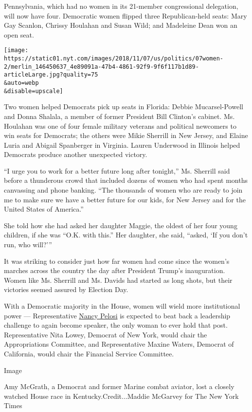 Pennsylvania, which had no women in its 21-member congressional
delegation, will now have four. Democratic women flipped three
Republican-held seats: Mary Gay Scanlon, Chrissy Houlahan and Susan
Wild; and Madeleine Dean won an open seat.

\texttt{[image: https://static01.nyt.com/images/2018/11/07/us/politics/07women-2/merlin\_146450637\_4e89091a-47b4-4861-92f9-9f6f117b1d89-articleLarge.jpg?quality=75\\\&auto=webp\\\&disable=upscale]}

Two women helped Democrats pick up seats in Florida: Debbie
Mucarsel-Powell and Donna Shalala, a member of former President Bill
Clinton's cabinet. Ms. Houlahan was one of four female military veterans
and political newcomers to win seats for Democrats; the others were
Mikie Sherrill in New Jersey, and Elaine Luria and Abigail Spanberger in
Virginia. Lauren Underwood in Illinois helped Democrats produce another
unexpected victory.

``I urge you to work for a better future long after tonight,'' Ms.
Sherrill said before a thunderous crowd that included dozens of women
who had spent months canvassing and phone banking. ``The thousands of
women who are ready to join me to make sure we have a better future for
our kids, for New Jersey and for the United States of America.''

She told how she had asked her daughter Maggie, the oldest of her four
young children, if she was ``O.K. with this.'' Her daughter, she said,
``asked, `If you don't run, who will?'''

It was striking to consider just how far women had come since the
women's marches across the country the day after President Trump's
inauguration. Women like Ms. Sherrill and Ms. Davids had started as long
shots, but their victories seemed assured by Election Day.

With a Democratic majority in the House, women will wield more
institutional power --- Representative
\href{https://www.nytimes.com/2018/11/07/us/politics/house-democrats-nancy-pelosi.html}{Nancy
Pelosi} is expected to beat back a leadership challenge to again become
speaker, the only woman to ever hold that post. Representative Nita
Lowey, Democrat of New York, would chair the Appropriations Committee,
and Representative Maxine Waters, Democrat of California, would chair
the Financial Service Committee.

Image

Amy McGrath, a Democrat and former Marine combat aviator, lost a closely
watched House race in Kentucky.Credit...Maddie McGarvey for The New York
Times

